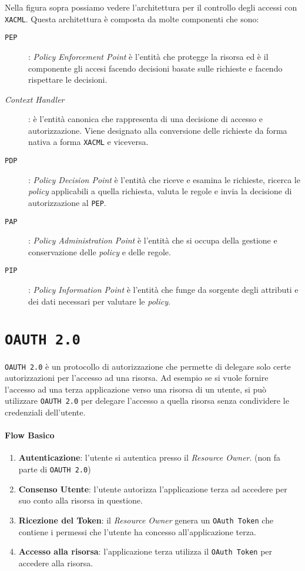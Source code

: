         Nella figura sopra possiamo vedere l'architettura per il controllo degli accessi con \texttt{XACML}. Questa architettura è composta da molte componenti che sono:
        \begin{description}
            \item[\texttt{PEP}]: \textit{Policy Enforcement Point} è l'entità che protegge la risorsa ed è il componente gli accesi facendo decisioni basate sulle richieste e facendo rispettare le decisioni.
            \item[\textit{Context Handler}]: è l'entità canonica che rappresenta di una decisione di accesso e autorizzazione. Viene designato alla conversione delle richieste da forma nativa a forma \texttt{XACML} e viceversa.
            \item[\texttt{PDP}]: \textit{Policy Decision Point} è l'entità che riceve e esamina le richieste, ricerca le \textit{policy} applicabili a quella richiesta, valuta le regole e invia la decisione di autorizzazione al \texttt{PEP}.
            \item[\texttt{PAP}]: \textit{Policy Administration Point} è l'entità che si occupa della gestione e conservazione delle \textit{policy} e delle regole.
            \item[\texttt{PIP}]: \textit{Policy Information Point} è l'entità che funge da sorgente degli attributi e dei dati necessari per valutare le \textit{policy}.
        \end{description}
\section{\texttt{OAUTH 2.0}}
    \texttt{OAUTH 2.0} è un protocollo di autorizzazione che permette di delegare solo certe autorizzazioni per l'accesso ad una risorsa. Ad esempio se si vuole fornire l'accesso ad una terza applicazione verso una risorsa di un utente, si può utilizzare \texttt{OAUTH 2.0} per delegare l'accesso a quella risorsa senza condividere le credenziali dell'utente.
    \paragraph{Flow Basico}
        \begin{enumerate}
            \item \textbf{Autenticazione}: l'utente si autentica presso il \textit{Resource Owner}. (non fa parte di \texttt{OAUTH 2.0})
            \item \textbf{Consenso Utente}: l'utente autorizza l'applicazione terza ad accedere per suo conto alla risorsa in questione.
            \item \textbf{Ricezione del Token}: il \textit{Resource Owner} genera un \texttt{OAuth Token} che contiene i permessi che l'utente ha concesso all'applicazione terza.
            \item \textbf{Accesso alla risorsa}: l'applicazione terza utilizza il \texttt{OAuth Token} per accedere alla risorsa.
        \end{enumerate}
